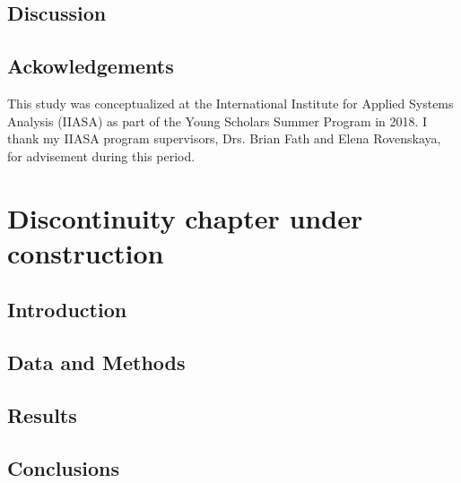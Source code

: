 \documentclass[12pt,twoside,openany]{reedthesis}
\begin{document}
\hypertarget{discussion-3}{%
\section{Discussion}\label{discussion-3}}

\hypertarget{ackowledgements}{%
\section{Ackowledgements}\label{ackowledgements}}

This study was conceptualized at the International Institute for Applied Systems Analysis (IIASA) as part of the Young Scholars Summer Program in 2018. I thank my IIASA program supervisors, Drs. Brian Fath and Elena Rovenskaya, for advisement during this period.

\hypertarget{discontinuity}{%
\chapter{Discontinuity chapter under construction}\label{discontinuity}}

\hypertarget{introduction-5}{%
\section{Introduction}\label{introduction-5}}

\hypertarget{data-and-methods-2}{%
\section{Data and Methods}\label{data-and-methods-2}}

\hypertarget{results-2}{%
\section{Results}\label{results-2}}

\hypertarget{conclusions}{%
\section{Conclusions}\label{conclusions}}
\end{document}
